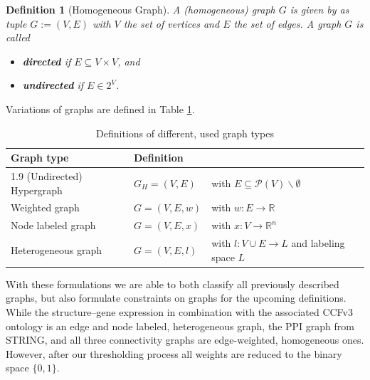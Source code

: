 \documentclass[]{article}
\newtheorem{mydef}{Definition}
\begin{document}
\begin{mydef}[Homogeneous Graph]
	A (homogeneous) graph $G$ is given by as tuple $G:=(V,E)$ with $V$ the set of vertices and $E$ the set of edges. A graph $G$ is called
	\begin{itemize}
		\item  \textbf{directed} if $E\subseteq V\times V$, and
		\item \textbf{undirected} if $E\in 2^V$.
	\end{itemize}
\end{mydef}

Variations of graphs are defined in Table \ref{tab:graph_types}.\\


\begin{table}
	\centering
	\renewcommand{\arraystretch}{2.1}
	\begin{tabular}{lll}
		Graph type&Definition&\\
		\hline1.9
		(Undirected) Hypergraph&$G_H=(V,E)$&with $E\subseteq\mathcal{P}(V)\backslash\emptyset$\\
		Weighted graph&$G=(V,E,w)$& with $w:E\rightarrow \mathbb{R}$\\
		Node labeled graph&$G=(V,E,x)$&with $x:V\rightarrow\mathbb{R}^n$\\
		Heterogeneous graph&$G=(V,E,l)$&with $l:V\cup E\rightarrow L$ and labeling space $L$\\
	\end{tabular}

 	\caption{Definitions of different, used graph types}
 	\label{tab:graph_types}

\end{table}


With these formulations we are able to both classify all previously described graphs, but also formulate constraints on graphs for the upcoming definitions. While the structure--gene expression in combination with the associated CCFv3 ontology is an edge and node labeled, heterogeneous graph, the PPI graph from STRING, and all three connectivity graphs are edge-weighted, homogeneous ones. However, after our thresholding process all weights are reduced to the binary space $\{0,1\}$.\\
\end{document}
